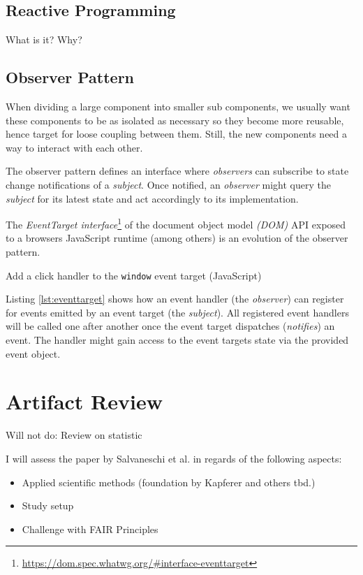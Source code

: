 \documentclass[12pt,a4paper]{article}
\begin{document}
\subsection{Reactive Programming}
What is it? Why?

\subsection{Observer Pattern}
When dividing a large component into smaller sub components, we usually want these components to be as isolated as necessary so they become more reusable, hence target for loose coupling between them. Still, the new components need a way to interact with each other.

The observer pattern \cite{gamma1995design} defines an interface where \emph{observers} can subscribe to state change notifications of a \emph{subject}. Once notified, an \emph{observer} might query the \emph{subject} for its latest state and act accordingly to its implementation.

The \emph{EventTarget interface}\footnote{\url{https://dom.spec.whatwg.org/\#interface-eventtarget}} of the document object model \emph{(DOM)} API exposed to a browsers JavaScript runtime (among others) is an evolution of the observer pattern.

\begin{listing}[H]
	\caption{Add a click handler to the \texttt{window} event target (JavaScript)}
	\label{lst:eventtarget}
\end{listing}

Listing \ref{lst:eventtarget} shows how an event handler (the \emph{observer}) can register for events emitted by an event target (the \emph{subject}). All registered event handlers will be called one after another once the event target dispatches (\emph{notifies}) an event. The handler might gain access to the event targets state via the provided event object.


\section{Artifact Review}
Will not do: Review on statistic

I will assess the paper by Salvaneschi et al. \cite{7827078} in regards of the following aspects:
\begin{itemize}
	\item Applied scientific methods (foundation by Kapferer \cite{kapferer:2019:empirical} and others tbd.)
	\item Study setup
	\item Challenge with FAIR Principles \cite{2019arXiv190805986H} \cite{wilkinson:2016}
\end{itemize}
\end{document}
